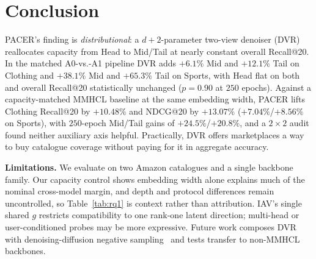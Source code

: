 \documentclass[conference]{IEEEtran}
\newcommand{\dvr}{DVR\xspace}
\begin{document}
\section{Conclusion}

PACER's finding is \emph{distributional}: a $d{+}2$-parameter
two-view denoiser (\dvr) reallocates capacity from Head to Mid/Tail
at nearly constant overall Recall@20. In the matched A0-vs.-A1
pipeline \dvr adds $+6.1\%$ Mid and $+12.1\%$ Tail on Clothing and
$+38.1\%$ Mid and $+65.3\%$ Tail on Sports, with Head flat on both
and overall Recall@20 statistically unchanged ($p{=}0.90$ at $250$
epochs). Against a capacity-matched MMHCL baseline at the same
embedding width, PACER lifts Clothing Recall@20 by $+10.48\%$ and
NDCG@20 by $+13.07\%$ ($+7.04\%$/$+8.56\%$ on Sports), with
$250$-epoch Mid/Tail gains of $+24.5\%$/$+20.8\%$, and a
$2{\times}2$ audit found neither auxiliary axis helpful.
Practically, \dvr offers marketplaces a way to buy catalogue coverage
without paying for it in aggregate accuracy.

\noindent\textbf{Limitations.} We evaluate on two Amazon catalogues
and a single backbone family. Our capacity control shows embedding
width alone explains much of the nominal cross-model margin, and depth
and protocol differences remain uncontrolled, so Table~\ref{tab:rq1}
is context rather than attribution. IAV's single shared
$g$ restricts compatibility to one rank-one latent direction;
multi-head or user-conditioned probes may be more expressive. Future work
composes \dvr with denoising-diffusion negative
sampling~\cite{nguyen2024diffusion} and tests transfer to non-MMHCL
backbones.



\end{document}
